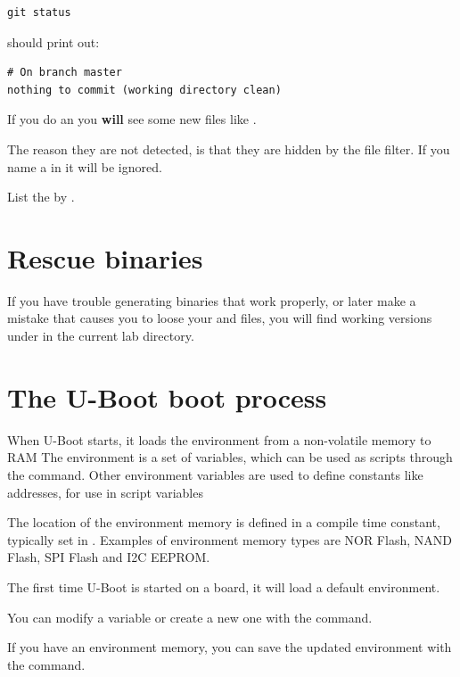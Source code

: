{\small
\begin{verbatim}
git status
\end{verbatim}
}

should print out:

\begin{verbatim}
# On branch master
nothing to commit (working directory clean)
\end{verbatim}

If you do an  you {\bf will} see some new files like .

The reason they are not detected, is that they are hidden by the  file 
filter. If you name a  in  it will be ignored.

List the  by .

\section{Rescue binaries}

If you have trouble generating binaries that work properly, or later
make a mistake that causes you to loose your  and
 files, you will find working versions under
 in the current lab directory.

\clearpage

\section{The U-Boot boot process}

When U-Boot starts, it loads the environment from a non-volatile memory to RAM
The environment is a set of variables, which can be used as scripts through the 
command. Other environment variables are used to define constants like addresses,
for use in script variables

The location of the environment memory is defined in a compile time constant,
typically set in .
Examples of environment memory types are NOR Flash, NAND Flash, SPI Flash and I2C EEPROM.

The first time U-Boot is started on a board, it will load a default environment.

You can modify a variable or create a new one with the  command.

If you have an environment memory, you can save the updated environment with the  command.

